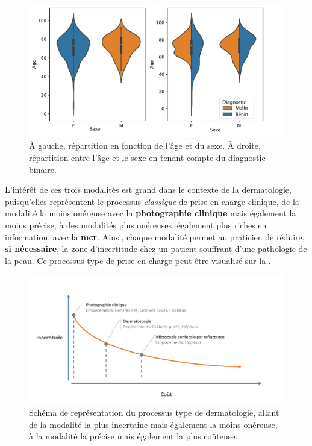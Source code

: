 \begin{figure}[H]
    \centering
    \includegraphics[width=\linewidth]{contents/chapter_4/resources/statistics_age_sex.pdf}
    \caption{À gauche, répartition en fonction de l'âge et du sexe. À droite, répartition entre l'âge et le sexe en tenant compte du diagnostic binaire.}
    \label{fig:statistics_age_sex}
\end{figure}\par

L'intérêt de ces trois modalités est grand dans le contexte de la dermatologie, puisqu'elles représentent le processus \textit{classique} de prise en charge clinique, de la modalité la moins onéreuse avec la \textbf{photographie clinique} mais également la moins précise, à des modalités plus onéreuses, également plus riches en information, avec la \textbf{\gls{mcr}}. Ainsi, chaque modalité permet au praticien de réduire, \textbf{si nécessaire}, la zone d'incertitude chez un patient souffrant d'une pathologie de la peau. Ce processus type de prise en charge peut être visualisé sur la .\par

\begin{figure}[H]
    \centering
    \includegraphics[width=\linewidth]{contents/chapter_4/resources/scheme_devices_location.pdf}
    \caption{Schéma de représentation du processus type de dermatologie, allant de la modalité la plus incertaine mais également la moins onéreuse, à la modalité la précise mais également la plus coûteuse.}
    \label{fig:scheme_devices_location}
\end{figure}\par

